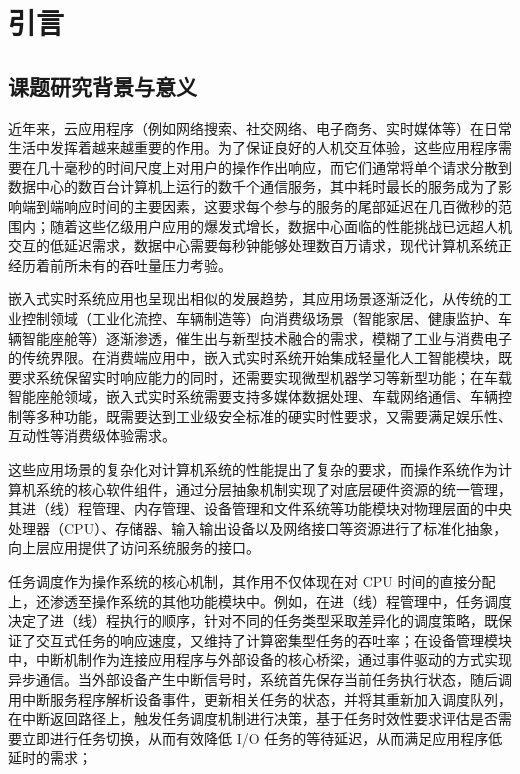 \chapter{引言}

\section{课题研究背景与意义}

近年来，云应用程序（例如网络搜索、社交网络、电子商务、实时媒体等）在日常生活中发挥着越来越重要的作用。为了保证良好的人机交互体验，这些应用程序需要在几十毫秒的时间尺度上对用户的操作作出响应，而它们通常将单个请求分散到数据中心的数百台计算机上运行的数千个通信服务，其中耗时最长的服务成为了影响端到端响应时间的主要因素，这要求每个参与的服务的尾部延迟在几百微秒的范围内；随着这些亿级用户应用的爆发式增长，数据中心面临的性能挑战已远超人机交互的低延迟需求，数据中心需要每秒钟能够处理数百万请求，现代计算机系统正经历着前所未有的吞吐量压力考验。

嵌入式实时系统应用也呈现出相似的发展趋势，其应用场景逐渐泛化，从传统的工业控制领域（工业化流控、车辆制造等）向消费级场景（智能家居、健康监护、车辆智能座舱等）逐渐渗透，催生出与新型技术融合的需求，模糊了工业与消费电子的传统界限。在消费端应用中，嵌入式实时系统开始集成轻量化人工智能模块，既要求系统保留实时响应能力的同时，还需要实现微型机器学习等新型功能；在车载智能座舱领域，嵌入式实时系统需要支持多媒体数据处理、车载网络通信、车辆控制等多种功能，既需要达到工业级安全标准的硬实时性要求，又需要满足娱乐性、互动性等消费级体验需求。

这些应用场景的复杂化对计算机系统的性能提出了复杂的要求，而操作系统作为计算机系统的核心软件组件，通过分层抽象机制实现了对底层硬件资源的统一管理，其进（线）程管理、内存管理、设备管理和文件系统等功能模块对物理层面的中央处理器（CPU）、存储器、输入输出设备以及网络接口等资源进行了标准化抽象，向上层应用提供了访问系统服务的接口。

任务调度作为操作系统的核心机制，其作用不仅体现在对 CPU 时间的直接分配上，还渗透至操作系统的其他功能模块中。例如，在进（线）程管理中，任务调度决定了进（线）程执行的顺序，针对不同的任务类型采取差异化的调度策略，既保证了交互式任务的响应速度，又维持了计算密集型任务的吞吐率；在设备管理模块中，中断机制作为连接应用程序与外部设备的核心桥梁，通过事件驱动的方式实现异步通信。当外部设备产生中断信号时，系统首先保存当前任务执行状态，随后调用中断服务程序解析设备事件，更新相关任务的状态，并将其重新加入调度队列，在中断返回路径上，触发任务调度机制进行决策，基于任务时效性要求评估是否需要立即进行任务切换，从而有效降低 I/O 任务的等待延迟，从而满足应用程序低延时的需求；

